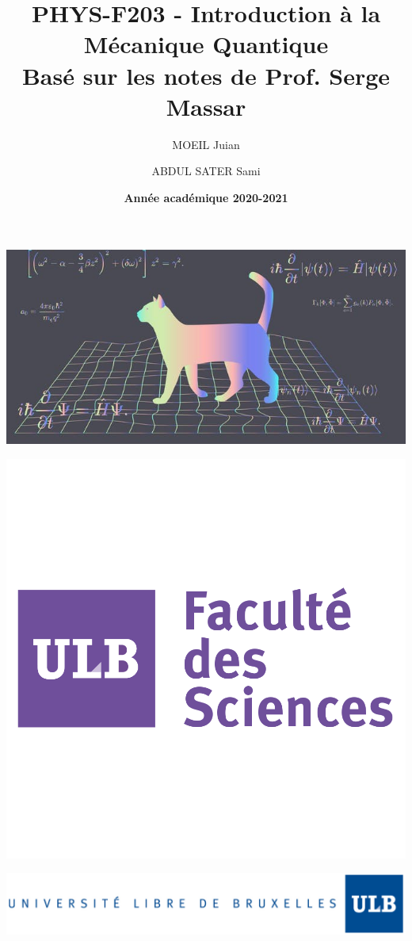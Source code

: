 \documentclass[a4paper]{article}
\title{\textbf{PHYS-F203 - Introduction à la Mécanique Quantique} \\ Basé sur les notes de Prof. Serge Massar}
\author{MOEIL Juian \and ABDUL SATER Sami}
\date{\textbf{Année académique 2020-2021}}
\numberwithin{equation}{part}
\begin{document}
\maketitle
\begin{center}
\includegraphics[scale=0.65]{Images/cat.jpg}
\end{center}
\begin{center}
\includegraphics[scale=0.20]{Images/sciences.png}
\end{center}
\begin{center}
\includegraphics[scale=0.45]{Images/ULB.jpg}
\end{center}
\end{document}
